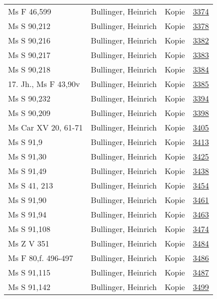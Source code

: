 \documentclass[10pt,a4paper,landscape]{report}
\begin{document}
\begin{longtable}{p{16cm}p{4cm}lr}
Ms F 46,599	&	Bullinger, Heinrich	&	Kopie	&	\href{http://130.60.24.72/assignment/3374}{3374}\\
Ms S 90,212	&	Bullinger, Heinrich	&	Kopie	&	\href{http://130.60.24.72/assignment/3378}{3378}\\
Ms S 90,216	&	Bullinger, Heinrich	&	Kopie	&	\href{http://130.60.24.72/assignment/3382}{3382}\\
Ms S 90,217	&	Bullinger, Heinrich	&	Kopie	&	\href{http://130.60.24.72/assignment/3383}{3383}\\
Ms S 90,218	&	Bullinger, Heinrich	&	Kopie	&	\href{http://130.60.24.72/assignment/3384}{3384}\\
17. Jh., Ms F 43,90v	&	Bullinger, Heinrich	&	Kopie	&	\href{http://130.60.24.72/assignment/3385}{3385}\\
Ms S 90,232	&	Bullinger, Heinrich	&	Kopie	&	\href{http://130.60.24.72/assignment/3394}{3394}\\
Ms S 90,209	&	Bullinger, Heinrich	&	Kopie	&	\href{http://130.60.24.72/assignment/3398}{3398}\\
Ms Car XV 20, 61-71	&	Bullinger, Heinrich	&	Kopie	&	\href{http://130.60.24.72/assignment/3405}{3405}\\
Ms S 91,9	&	Bullinger, Heinrich	&	Kopie	&	\href{http://130.60.24.72/assignment/3413}{3413}\\
Ms S 91,30	&	Bullinger, Heinrich	&	Kopie	&	\href{http://130.60.24.72/assignment/3425}{3425}\\
Ms S 91,49	&	Bullinger, Heinrich	&	Kopie	&	\href{http://130.60.24.72/assignment/3438}{3438}\\
Ms S 41, 213	&	Bullinger, Heinrich	&	Kopie	&	\href{http://130.60.24.72/assignment/3454}{3454}\\
Ms S 91,90	&	Bullinger, Heinrich	&	Kopie	&	\href{http://130.60.24.72/assignment/3461}{3461}\\
Ms S 91,94	&	Bullinger, Heinrich	&	Kopie	&	\href{http://130.60.24.72/assignment/3463}{3463}\\
Ms S 91,108	&	Bullinger, Heinrich	&	Kopie	&	\href{http://130.60.24.72/assignment/3474}{3474}\\
Ms Z V 351	&	Bullinger, Heinrich	&	Kopie	&	\href{http://130.60.24.72/assignment/3484}{3484}\\
Ms F 80,f. 496-497	&	Bullinger, Heinrich	&	Kopie	&	\href{http://130.60.24.72/assignment/3486}{3486}\\
Ms S 91,115	&	Bullinger, Heinrich	&	Kopie	&	\href{http://130.60.24.72/assignment/3487}{3487}\\
Ms S 91,142	&	Bullinger, Heinrich	&	Kopie	&	\href{http://130.60.24.72/assignment/3499}{3499}\\

\end{longtable}
\end{document}

